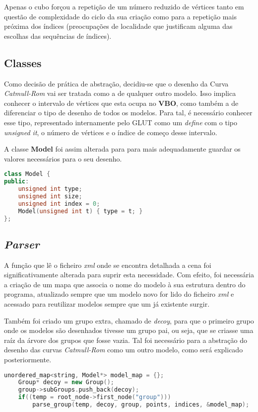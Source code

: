 \documentclass[14pt, a4 paper]{report}
\begin{document}
Apenas o cubo forçou a repetição de um número reduzido de vértices tanto em questão de complexidade do ciclo da sua criação como para a repetição mais próxima dos índices (preocupações de localidade que justificam alguma das escolhas das sequências de índices).

\subsection{Classes}

Como decisão de prática de abstração, decidiu-se que o desenho da Curva \textit{Catmull-Rom} vai ser tratada como a de qualquer outro modelo. Isso implica conhecer o intervalo de vértices que esta ocupa no \textbf{VBO}, como também a de diferenciar o tipo de desenho de todos os modelos. Para tal, é necessário conhecer esse tipo, representado internamente pelo GLUT como um \textit{define} com o tipo \textit{unsigned it}, o número de vértices e o índice de começo desse intervalo.

A classe \textbf{Model} foi assim alterada para para mais adequadamente guardar os valores necessários para o seu desenho.

\begin{lstlisting}[language = c++]
class Model {
public:
    unsigned int type;
    unsigned int size;
    unsigned int index = 0;
    Model(unsigned int t) { type = t; }
};
\end{lstlisting}

\subsection{\textit{Parser}}

A função que lê o ficheiro \textit{xml} onde se encontra detalhada a cena foi significativamente alterada para suprir esta necessidade. Com efeito, foi necessária a criação de um mapa que associa o nome do modelo à sua estrutura dentro do programa, atualizado sempre que um modelo novo for lido do ficheiro \textit{xml} e acessado para reutilizar modelos sempre que um já existente surgir. 

Também foi criado um grupo extra, chamado de \textit{decoy}, para que o primeiro grupo onde os modelos são desenhados tivesse um grupo pai, ou seja, que se criasse uma raíz da árvore dos grupos que fosse vazia. Tal foi necessário para a abstração do desenho das curvas \textit{Catmull-Rom} como um outro modelo, como será explicado posteriormente. 

\begin{lstlisting}[language = c++]
unordered_map<string, Model*> model_map = {};
    Group* decoy = new Group();
    group->subGroups.push_back(decoy);
    if((temp = root_node->first_node("group")))
        parse_group(temp, decoy, group, points, indices, &model_map);
\end{lstlisting}
\end{document}
